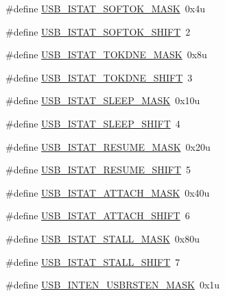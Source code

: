 \begin{DoxyCompactItemize}
\item 
\#define \hyperlink{group___u_s_b___register___masks_gab45774502290aab38038a19110e8558b}{U\+S\+B\+\_\+\+I\+S\+T\+A\+T\+\_\+\+S\+O\+F\+T\+O\+K\+\_\+\+M\+A\+SK}~0x4u
\item 
\#define \hyperlink{group___u_s_b___register___masks_gae58407103a8cebfc9c4a8e8c7f08fddb}{U\+S\+B\+\_\+\+I\+S\+T\+A\+T\+\_\+\+S\+O\+F\+T\+O\+K\+\_\+\+S\+H\+I\+FT}~2
\item 
\#define \hyperlink{group___u_s_b___register___masks_ga12db7650592f7e48ae702b71d1728c98}{U\+S\+B\+\_\+\+I\+S\+T\+A\+T\+\_\+\+T\+O\+K\+D\+N\+E\+\_\+\+M\+A\+SK}~0x8u
\item 
\#define \hyperlink{group___u_s_b___register___masks_ga55bb01da118027c84423bfcb317eabb5}{U\+S\+B\+\_\+\+I\+S\+T\+A\+T\+\_\+\+T\+O\+K\+D\+N\+E\+\_\+\+S\+H\+I\+FT}~3
\item 
\#define \hyperlink{group___u_s_b___register___masks_ga008ba082c8646490852ad753ebcf4e62}{U\+S\+B\+\_\+\+I\+S\+T\+A\+T\+\_\+\+S\+L\+E\+E\+P\+\_\+\+M\+A\+SK}~0x10u
\item 
\#define \hyperlink{group___u_s_b___register___masks_ga724873614965bae7c2d6c45aa4731f70}{U\+S\+B\+\_\+\+I\+S\+T\+A\+T\+\_\+\+S\+L\+E\+E\+P\+\_\+\+S\+H\+I\+FT}~4
\item 
\#define \hyperlink{group___u_s_b___register___masks_ga072350db0370ccd930e192c850ef52d9}{U\+S\+B\+\_\+\+I\+S\+T\+A\+T\+\_\+\+R\+E\+S\+U\+M\+E\+\_\+\+M\+A\+SK}~0x20u
\item 
\#define \hyperlink{group___u_s_b___register___masks_gadf654883244211ef077839ab67084069}{U\+S\+B\+\_\+\+I\+S\+T\+A\+T\+\_\+\+R\+E\+S\+U\+M\+E\+\_\+\+S\+H\+I\+FT}~5
\item 
\#define \hyperlink{group___u_s_b___register___masks_gaad79229bb3a2c9199b50a86a8f4c49fa}{U\+S\+B\+\_\+\+I\+S\+T\+A\+T\+\_\+\+A\+T\+T\+A\+C\+H\+\_\+\+M\+A\+SK}~0x40u
\item 
\#define \hyperlink{group___u_s_b___register___masks_ga7820c4cabf21bbbab066e4db9f2bb4b1}{U\+S\+B\+\_\+\+I\+S\+T\+A\+T\+\_\+\+A\+T\+T\+A\+C\+H\+\_\+\+S\+H\+I\+FT}~6
\item 
\#define \hyperlink{group___u_s_b___register___masks_gaab3ce766c4d9a80eaddf42589789ab2d}{U\+S\+B\+\_\+\+I\+S\+T\+A\+T\+\_\+\+S\+T\+A\+L\+L\+\_\+\+M\+A\+SK}~0x80u
\item 
\#define \hyperlink{group___u_s_b___register___masks_ga02df98ee1c82991ef063f89d4ef6ce2b}{U\+S\+B\+\_\+\+I\+S\+T\+A\+T\+\_\+\+S\+T\+A\+L\+L\+\_\+\+S\+H\+I\+FT}~7
\item 
\#define \hyperlink{group___u_s_b___register___masks_ga67ed1b19b1fe4e25fc5ccf7bf0d42c38}{U\+S\+B\+\_\+\+I\+N\+T\+E\+N\+\_\+\+U\+S\+B\+R\+S\+T\+E\+N\+\_\+\+M\+A\+SK}~0x1u

\end{DoxyCompactItemize}
